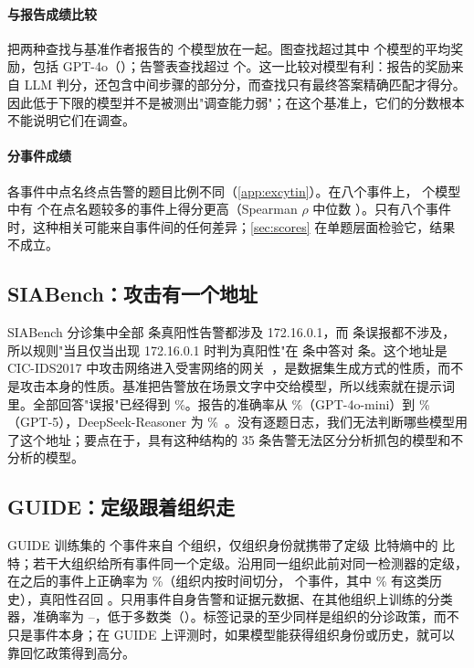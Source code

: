 \paragraph{与报告成绩比较}  把两种查找与基准作者报告的 \oModels{} 个模型放在一起。图查找超过其中 \oBelowGraph{} 个模型的平均奖励，包括 GPT-4o（\exGptFo）；告警表查找超过 \oBelowTable{} 个。这一比较对模型有利：报告的奖励来自 LLM 判分，还包含中间步骤的部分分，而查找只有最终答案精确匹配才得分。因此低于下限的模型并不是被测出"调查能力弱"；在这个基准上，它们的分数根本不能说明它们在调查。

\paragraph{分事件成绩} 各事件中点名终点告警的题目比例不同（\cref{app:excytin}）。在八个事件上，\oModels{} 个模型中有 \oHPos{} 个在点名题较多的事件上得分更高（Spearman $\rho$ 中位数 \oHMedian）。只有八个事件时，这种相关可能来自事件间的任何差异；\cref{sec:scores} 在单题层面检验它，结果不成立。

\subsection{SIABench：攻击有一个地址}
\label{sec:siabench}

SIABench 分诊集中全部 \siaTP{} 条真阳性告警都涉及 172.16.0.1，而 \siaMajority{} 条误报都不涉及，所以规则"当且仅当出现 172.16.0.1 时判为真阳性"在 \siaN{} 条中答对 \siaRule{} 条。这个地址是 CIC-IDS2017 中攻击网络进入受害网络的网关~\citep{cicids2017}，是数据集生成方式的性质，而不是攻击本身的性质。基准把告警放在场景文字中交给模型，所以线索就在提示词里。全部回答"误报"已经得到 \siaMajorityPct\%。报告的准确率从 \siaMini\%（GPT-4o-mini）到 \siaGptFive\%（GPT-5），DeepSeek-Reasoner 为 \siaDeepSeek\%~\citep{siabench}。没有逐题日志，我们无法判断哪些模型用了这个地址；要点在于，具有这种结构的 35 条告警无法区分分析抓包的模型和不分析的模型。

\subsection{GUIDE：定级跟着组织走}
\label{sec:guide}

GUIDE 训练集的 \gIncidents{} 个事件来自 \gOrgs{} 个组织，仅组织身份就携带了定级 \gH{} 比特熵中的 \gMIorg{} 比特；若干大组织给所有事件同一个定级。沿用同一组织此前对同一检测器的定级，在之后的事件上正确率为 \gHistPct\%（组织内按时间切分，\gDev{} 个事件，其中 \gSeen\% 有这类历史），真阳性召回 \gHistTP。只用事件自身告警和证据元数据、在其他组织上训练的分类器，准确率为 \gHeldMin--\gHeldMax，低于多数类（\gHeldMajority）。标签记录的至少同样是组织的分诊政策，而不只是事件本身；在 GUIDE 上评测时，如果模型能获得组织身份或历史，就可以靠回忆政策得到高分。

